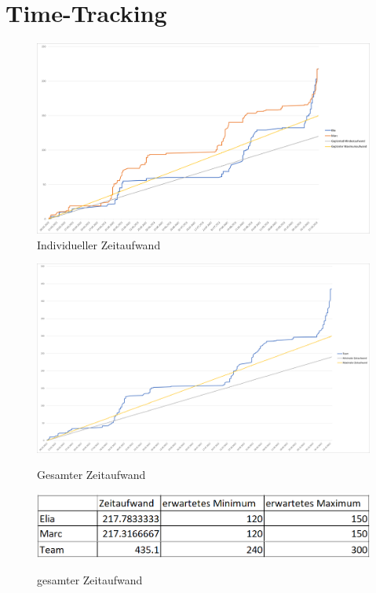 \section{Time-Tracking}
\begin{figure}[H]
    \centering
    \includegraphics[width=15cm]{resources/graph.png}\\
    \caption{Individueller Zeitaufwand}
    \vspace{0.5cm}
    \includegraphics[width=15cm]{resources/graph 2.png}\\
    \caption{Gesamter Zeitaufwand}
\end{figure}    


\begin{figure}[H]
    \centering
    \includegraphics[width=15cm]{resources/tracket_time_temp.png}\\
    \caption{gesamter Zeitaufwand}
\end{figure}




